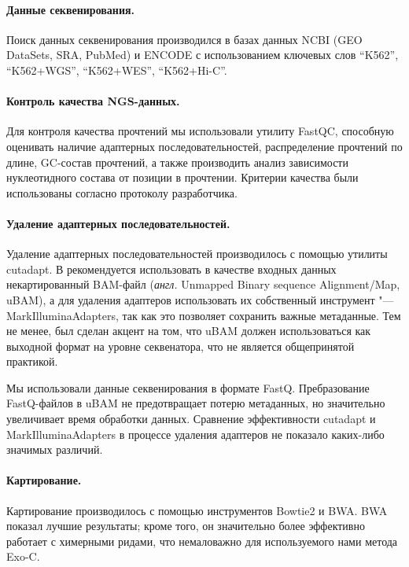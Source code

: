 \documentclass[a4paper,12pt]{article}
\begin{document}
\paragraph{Данные секвенирования.}
Поиск данных секвенирования производился в базах данных NCBI (GEO DataSets, SRA, PubMed) и ENCODE с использованием ключевых слов ``K562'', ``K562+WGS'', ``K562+WES'', ``K562+Hi-C''.

\paragraph{Контроль качества NGS-данных.}
Для контроля качества прочтений мы использовали утилиту FastQC\cite{FastQC}, способную оценивать наличие адаптерных последовательностей, распределение прочтений по длине, GC-состав прочтений, а также производить анализ зависимости нуклеотидного состава от позиции в прочтении.
Критерии качества были использованы согласно протоколу разработчика\cite{FastQC}.

\paragraph{Удаление адаптерных последовательностей.}
Удаление адаптерных последовательностей производилось с помощью утилиты cutadapt\cite{Martin_2011}.
В \cite{Auwera_2013} рекомендуется использовать в качестве входных данных некартированный BAM-файл (\textit{англ.} Unmapped Binary sequence Alignment/Map, uBAM), а для удаления адаптеров использовать их собственный инструмент "--- MarkIlluminaAdapters, так как это позволяет сохранить важные метаданные.
Тем не менее, был сделан акцент на том, что uBAM должен использоваться как выходной формат на уровне секвенатора, что не является общепринятой практикой.

Мы использовали данные секвенирования в формате FastQ.
Пребразование FastQ-файлов в uBAM не предотвращает потерю метаданных, но значительно увеличивает время обработки данных.
Сравнение эффективности cutadapt и MarkIlluminaAdapters в процессе удаления адаптеров не показало каких-либо значимых различий.

\paragraph{Картирование.}
Картирование производилось с помощью инструментов Bowtie2\cite{Langmead_2012} и BWA\cite{Li_2009}.
BWA показал лучшие результаты;
кроме того, он значительно более эффективно работает с химерными ридами, что немаловажно для используемого нами метода Exo-C.
\end{document}
